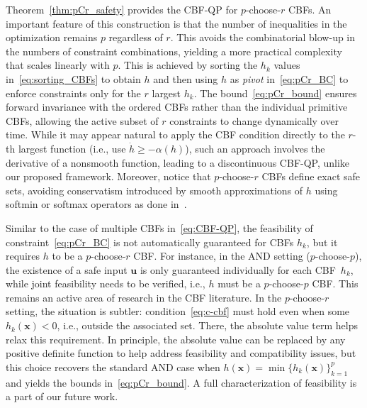 \documentclass[journal,twoside,web]{ieeecolor}
\theoremstyle{definition}
\newcommand{\bu}{\mathbf{u}}
\newcommand{\bx}{\mathbf{x}}
\begin{document}
Theorem~\ref{thm:pCr_safety} provides the CBF-QP for $p$-choose-$r$ CBFs. An important feature of this construction is that the number of inequalities in the optimization remains $p$ regardless of $r$. This avoids the combinatorial blow-up in the numbers of constraint combinations, yielding a more practical complexity that scales linearly with $p$. This is achieved by sorting the $h_k$ values in~\eqref{eq:sorting_CBFs} to obtain $h$ and then using $h$ as \textit{pivot} in~\eqref{eq:pCr_BC} to enforce constraints only for the $r$ largest $h_k$. The bound~\eqref{eq:pCr_bound} ensures forward invariance with the ordered CBFs rather than the individual primitive CBFs, allowing the active subset of $r$ constraints to change dynamically over time. While it may appear natural to apply the CBF condition directly to the $r$-th largest function (i.e., use ${\dot h \geq -\alpha(h)}$), such an approach involves the derivative of a nonsmooth function, leading to a discontinuous CBF-QP, unlike our proposed framework. Moreover, notice that $p$-choose-$r$ CBFs define exact safe sets, avoiding conservatism introduced by smooth approximations of $h$ using softmin or softmax operators as done in~\cite{TGM-ADA:23, TGM:25, MB-DP:23}. 

Similar to the case of multiple CBFs in~\eqref{eq:CBF-QP}, the feasibility of constraint~\eqref{eq:pCr_BC} is not automatically guaranteed for CBFs $h_k$, but it requires $h$ to be a $p$-choose-$r$ CBF. For instance, in the AND setting ($p$-choose-$p$), the existence of a safe input $\bu$ is only guaranteed individually for each CBF~$h_k$, while joint feasibility needs to be verified, i.e., $h$ must be a $p$-choose-$p$ CBF. This remains an active area of research in the CBF literature. In the $p$-choose-$r$ setting, the situation is subtler: condition~\eqref{eq:c-cbf} must hold even when some ${h_k(\bx)<0}$, i.e., outside the associated set. There, the absolute value term helps relax this requirement. In principle, the absolute value can be replaced by any positive definite function to help address feasibility and compatibility issues, but this choice recovers the standard AND case when ${h(\bx) = \min\{h_k(\bx)\}_{k=1}^p}$ and yields the bounds in~\eqref{eq:pCr_bound}. A full characterization of feasibility is a part of our future work.
\end{document}
